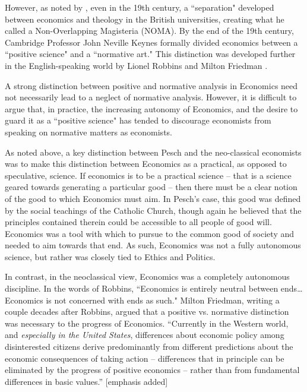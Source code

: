 \documentclass{article}
\begin{document}
However, as noted by \citet{emmett2014}, even in the 19th century, a ``separation" developed between economics and theology in the British universities, creating what he called a Non-Overlapping Magisteria (NOMA).  By the end of the 19th century, Cambridge Professor John Neville Keynes formally divided economics between a ``positive science" and a ``normative art." \citep{keynes1904}  This distinction was developed further in the English-speaking world by Lionel Robbins \citep{robbins1932} and Milton Friedman \citep{friedman1953}.\medskip

A strong distinction between positive and normative analysis in Economics need not necessarily lead to a neglect of normative analysis.  However, it is difficult to argue that, in practice, the increasing autonomy of Economics, and the desire to guard it as a ``positive science" has tended to discourage economists from speaking on normative matters as economists.\medskip

As noted above, a key distinction between Pesch and the neo-classical economists was to make this distinction between Economics as a practical, as opposed to speculative, science.  If economics is to be a practical science – that is a science geared towards generating a particular good – then there must be a clear notion of the good to which Economics must aim.  In Pesch’s case, this good was defined by the social teachings of the Catholic Church, though again he believed that the principles contained therein could be accessible to all people of good will.    Economics was a tool with which to pursue to the common good of society and needed to aim towards that end.  As such, Economics was not a fully autonomous science, but rather was closely tied to Ethics and Politics.\medskip

In contrast, in the neoclassical view, Economics was a completely autonomous discipline.  In the words of Robbins, ``Economics is entirely neutral between ends…  Economics is not concerned with ends as such." \citep[p. 24]{robbins1932}  Milton Friedman, writing a couple decades after Robbins, argued that a positive vs. normative distinction was necessary to the progress of Economics.  ``Currently in the Western world, and \emph{especially in the United States}, differences about economic policy among disinterested citizens derive predominantly from different predictions about the economic consequences of taking action – differences that in principle can be eliminated by the progress of positive economics – rather than from fundamental differences in basic values.” [emphasis added] \citep[p. 5]{friedman1953}\medskip
\end{document}
